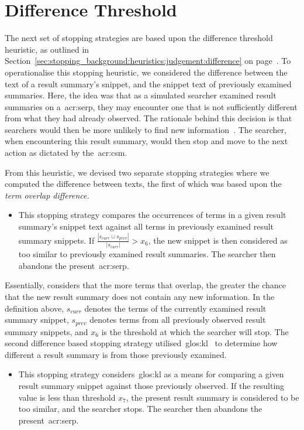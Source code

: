 \section{Difference Threshold}
The next set of stopping strategies are based upon the difference threshold heuristic, as outlined in Section~\ref{sec:stopping_background:heuristics:judgement:difference} on page~\pageref{sec:stopping_background:heuristics:judgement:difference}. To operationalise this stopping heuristic, we considered the difference between the text of a result summary's snippet, and the snippet text of previously examined summaries. Here, the idea was that as a simulated searcher examined result summaries on a~\gls{acr:serp}, they may encounter one that is not sufficiently different from what they had already observed. The rationale behind this decision is that searchers would then be more unlikely to find new information~\citep{nickles1995judgment}. The searcher, when encountering this result summary, would then stop and move to the next action as dictated by the~\gls{acr:csm}.

From this heuristic, we devised two separate stopping strategies where we computed the difference between texts, the first of which was based upon the \emph{term overlap difference.}

\begin{itemize}
    \item{ This stopping strategy compares the occurrences of terms in a given result summary's snippet text against all terms in previously examined result summary snippets. If $\frac{|s_{curr} \cup s_{prev}|}{|s_{curr}|} > x_6$, the new snippet is then considered as too similar to previously examined result summaries. The searcher then abandons the present~\gls{acr:serp}.}
\end{itemize}

Essentially,  considers that the more terms that overlap, the greater the chance that the new result summary does not contain any new information. In the definition above, $s_{curr}$ denotes the terms of the currently examined result summary snippet, $s_{prev}$ denotes terms from all previously observed result summary snippets, and $x_6$ is the threshold at which the searcher will stop. The second difference based stopping strategy utilised~\gls{glos:kl}~\citep{kullback1951information} to determine how different a result summary is from those previously examined.

\begin{itemize}
    \item{ This stopping strategy considers~\gls{glos:kl} as a means for comparing a given result summary snippet against those previously observed. If the resulting value is less than threshold $x_7$, the present result summary is considered to be too similar, and the searcher stops. The searcher then abandons the present~\gls{acr:serp}.}
\end{itemize}

